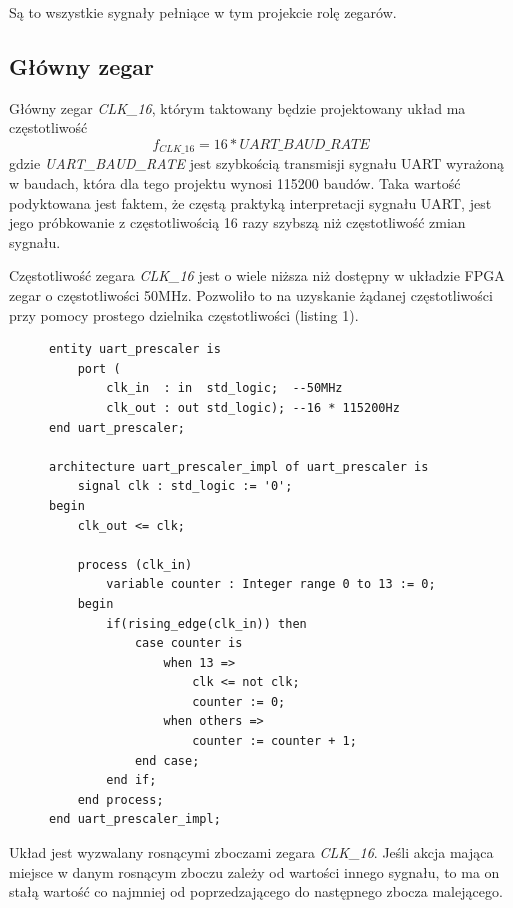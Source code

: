Są to wszystkie sygnały pełniące w tym projekcie rolę zegarów.

\subsection{Główny zegar}
\label{sec:clk-16}
Główny zegar \textit{CLK\_16}, którym taktowany będzie projektowany układ ma częstotliwość
\begin{equation}
f_{CLK\_16} = 16 * UART\_BAUD\_RATE
\end{equation}
gdzie \textit{UART\_BAUD\_RATE} jest szybkością transmisji sygnału UART wyrażoną w baudach, która dla tego projektu wynosi 115200 baudów. Taka wartość podyktowana jest faktem, że częstą praktyką interpretacji sygnału UART, jest jego próbkowanie z częstotliwością 16 razy szybszą niż częstotliwość zmian sygnału.

Częstotliwość zegara \textit{CLK\_16} jest o wiele niższa niż dostępny w układzie FPGA zegar o częstotliwości 50MHz. Pozwoliło to na uzyskanie żądanej częstotliwości przy pomocy prostego dzielnika częstotliwości (listing 1).

\begin{figure}[!h]
\begin{lstlisting}[style=vhdl, caption={Dzielnik częstotliwości \textit{uart\_prescaler}}, captionpos=b]
entity uart_prescaler is
	port (
		clk_in  : in  std_logic;  --50MHz
		clk_out : out std_logic); --16 * 115200Hz
end uart_prescaler;

architecture uart_prescaler_impl of uart_prescaler is
	signal clk : std_logic := '0';
begin
	clk_out <= clk;
	
	process (clk_in) 
		variable counter : Integer range 0 to 13 := 0;
	begin	
		if(rising_edge(clk_in)) then
			case counter is
				when 13 =>
					clk <= not clk;
					counter := 0;
				when others =>
					counter := counter + 1;
			end case;
		end if;
	end process;
end uart_prescaler_impl;
\end{lstlisting}
\end{figure}

Układ jest wyzwalany rosnącymi zboczami zegara \textit{CLK\_16}. Jeśli akcja mająca miejsce w danym rosnącym zboczu zależy od wartości innego sygnału, to ma on stałą wartość co najmniej od poprzedzającego do następnego zbocza malejącego.

